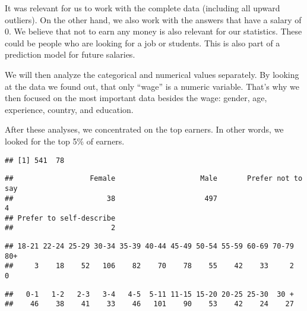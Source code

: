 \documentclass[
]{article}
\begin{document}
It was relevant for us to work with the complete data (including all
upward outliers). On the other hand, we also work with the answers that
have a salary of 0. We believe that not to earn any money is also
relevant for our statistics. These could be people who are looking for a
job or students. This is also part of a prediction model for future
salaries.

We will then analyze the categorical and numerical values separately. By
looking at the data we found out, that only ``wage'' is a numeric
variable. That's why we then focused on the most important data besides
the wage: gender, age, experience, country, and education.

After these analyses, we concentrated on the top earners. In other
words, we looked for the top 5\% of earners.

\begin{verbatim}
## [1] 541  78
\end{verbatim}

\begin{verbatim}
##                  Female                    Male       Prefer not to say 
##                      38                     497                       4 
## Prefer to self-describe 
##                       2
\end{verbatim}

\begin{verbatim}
## 18-21 22-24 25-29 30-34 35-39 40-44 45-49 50-54 55-59 60-69 70-79   80+ 
##     3    18    52   106    82    70    78    55    42    33     2     0
\end{verbatim}

\begin{verbatim}
##   0-1   1-2   2-3   3-4   4-5  5-11 11-15 15-20 20-25 25-30  30 + 
##    46    38    41    33    46   101    90    53    42    24    27
\end{verbatim}
\end{document}
